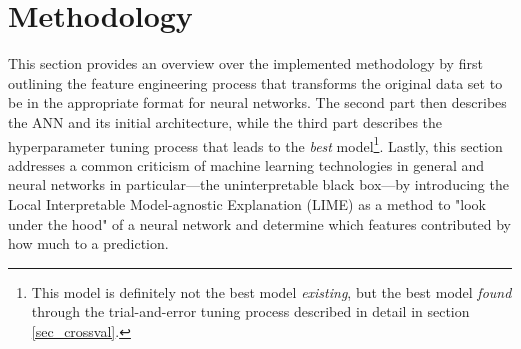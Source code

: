 \documentclass[12pt,a4paper]{article}
\begin{document}
\section{Methodology}
This section provides an overview over the implemented methodology by first outlining the feature engineering process that transforms the original data set
to be in the appropriate format for neural networks.
The second part then describes the ANN and its initial architecture, while the third part describes the hyperparameter tuning process
that leads to the \textit{best} model\footnote{This model is definitely not the best model \textit{existing}, but the best model \textit{found} through the trial-and-error tuning process described in detail in section \ref{sec_crossval}.}.
Lastly, this section addresses a common criticism of machine learning technologies in general and neural networks in particular---the 
uninterpretable black box---by introducing the Local Interpretable Model-agnostic Explanation (LIME) as a method to 
"look under the hood" of a neural network and determine which features contributed by how much to a prediction.
\end{document}
